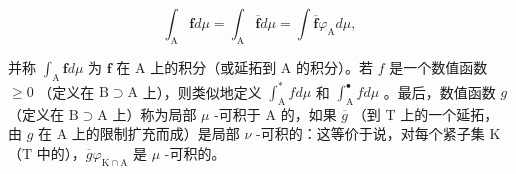 \[
\int_ {\mathrm{A}} \mathbf {f} d \mu = \int_ {\mathrm{A}} \overline {{\mathbf {f}}} d \mu = \int \overline {{\mathbf {f}}} \varphi_ {\mathrm{A}} d \mu ,
\]

并称 \(\int_{\mathrm{A}} \mathbf{f} d\mu\) 为 \(\mathbf{f}\) 在 \(\mathrm{A}\) 上的积分（或延拓到 \(\mathrm{A}\) 的积分）。若 \(f\) 是一个数值函数 \(\geqslant 0\) （定义在 \(\mathrm{B} \supset \mathrm{A}\) 上），则类似地定义 \(\int_{\mathrm{A}}^{*} f d\mu\) 和 \(\int_{\mathrm{A}}^{\bullet} f d\mu\) 。最后，数值函数 \(g\) （定义在 \(\mathrm{B} \supset \mathrm{A}\) 上）称为局部 \(\mu\) -可积于 \(\mathrm{A}\) 的，如果 \(\overline{g}\) （到 \(\mathrm{T}\) 上的一个延拓，由 \(g\) 在 \(\mathrm{A}\) 上的限制扩充而成）是局部 \(\nu\) -可积的：这等价于说，对每个紧子集 \(\mathrm{K}\) （\(\mathrm{T}\) 中的），\(\overline{g}\varphi_{\mathrm{K} \cap \mathrm{A}}\) 是 \(\mu\) -可积的。

